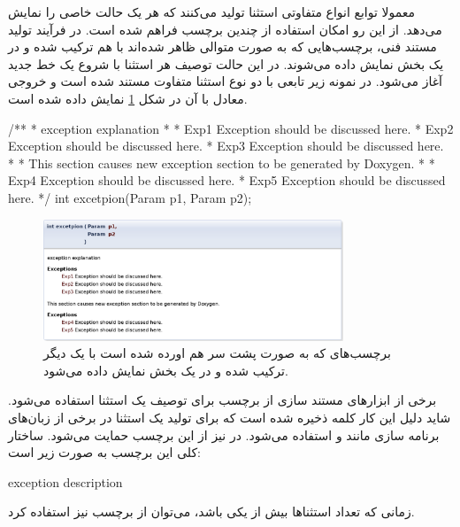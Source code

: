 معمولا توابع انواع متفاوتی استثنا تولید می‌کنند که هر یک حالت خاصی را نمایش می‌دهد.
از این رو امکان استفاده از چندین برچسب  فراهم شده است.
در فرآیند تولید مستند فنی، برچسب‌هایی که به صورت متوالی ظاهر شده‌اند با هم ترکیب
شده و در یک بخش نمایش داده می‌شوند.
در این حالت توصیف هر استثنا با شروع یک خط جدید آغاز می‌شود.
در نمونه زیر تابعی با دو نوع استثنا متفاوت مستند شده است و خروجی معادل با آن در شکل 
\ref{write/document-the-code/function/exception} نمایش داده شده است.
\begin{C++}
/**
 * \brief exception explanation
 *
 * \exception Exp1 Exception should be discussed here.
 * \exception Exp2 Exception should be discussed here.
 * \exception Exp3 Exception should be discussed here.
 *
 * This section causes new exception section to be generated by Doxygen.
 *
 * \exception Exp4 Exception should be discussed here.
 * \exception Exp5 Exception should be discussed here.
 */
int excetpion(Param p1, Param p2);
\end{C++} 
\begin{figure}
	\centering
	\includegraphics[width=0.8\textwidth]{image/write/document-the-code/function/exception}
	\caption[استثناهای یک تابع]{
		برچسب‌های  که به صورت پشت سر هم اورده شده است با یک دیگر ترکیب شده 
		و در یک بخش نمایش داده می‌شود.
	}
	\label{write/document-the-code/function/exception}
\end{figure}

برخی از ابزارهای مستند سازی از برچسب  برای توصیف یک استثنا استفاده می‌شود.
شاید دلیل این کار کلمه ذخیره شده  است که برای تولید یک استثنا در برخی
از زبان‌های برنامه سازی مانند  و  استفاده می‌شود.
در  نیز از این برچسب حمایت می‌شود.
ساختار کلی این برچسب به صورت زیر است:
\begin{C++}
 { exception description }
\end{C++}

زمانی که تعداد استثناها بیش از یکی باشد، می‌توان از برچسب  نیز استفاده کرد.

